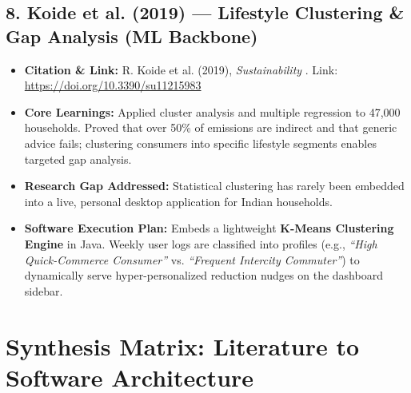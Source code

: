 \documentclass[12pt, a4paper]{article}
\begin{document}
\subsection{8. Koide et al. (2019) --- Lifestyle Clustering \& Gap Analysis (ML Backbone)}
\begin{itemize}[leftmargin=*]
    \item \textbf{Citation \& Link:} R. Koide et al. (2019), \textit{Sustainability} \cite{koide2019carbon}. Link: \href{https://doi.org/10.3390/su11215983}{https://doi.org/10.3390/su11215983}
    \item \textbf{Core Learnings:} Applied cluster analysis and multiple regression to 47,000 households. Proved that over 50\% of emissions are indirect and that generic advice fails; clustering consumers into specific lifestyle segments enables targeted gap analysis.
    \item \textbf{Research Gap Addressed:} Statistical clustering has rarely been embedded into a live, personal desktop application for Indian households.
    \item \textbf{Software Execution Plan:} Embeds a lightweight \textbf{K-Means Clustering Engine} in Java. Weekly user logs are classified into profiles (e.g., \textit{``High Quick-Commerce Consumer''} vs. \textit{``Frequent Intercity Commuter''}) to dynamically serve hyper-personalized reduction nudges on the dashboard sidebar.
\end{itemize}

\section{Synthesis Matrix: Literature to Software Architecture}
\end{document}
